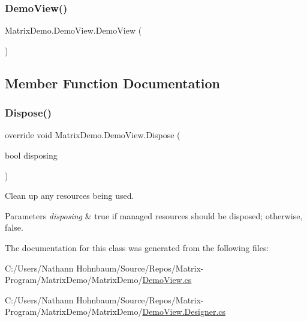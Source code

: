 \subsubsection{\texorpdfstring{Demo\+View()}{DemoView()}}
{\footnotesize\ttfamily Matrix\+Demo.\+Demo\+View.\+Demo\+View (\begin{DoxyParamCaption}{ }\end{DoxyParamCaption})}



\subsection{Member Function Documentation}
\mbox{\label{class_matrix_demo_1_1_demo_view_a81f680e49d2873816234e512c49f07b7}} 
\subsubsection{\texorpdfstring{Dispose()}{Dispose()}}
{\footnotesize\ttfamily override void Matrix\+Demo.\+Demo\+View.\+Dispose (\begin{DoxyParamCaption}\item[{bool}]{disposing }\end{DoxyParamCaption})\hspace{0.3cm}{\ttfamily [protected]}}



Clean up any resources being used. 


\begin{DoxyParams}{Parameters}
{\em disposing} & true if managed resources should be disposed; otherwise, false.\\
\hline
\end{DoxyParams}


The documentation for this class was generated from the following files\+:\begin{DoxyCompactItemize}
\item 
C\+:/\+Users/\+Nathann Hohnbaum/\+Source/\+Repos/\+Matrix-\/\+Program/\+Matrix\+Demo/\+Matrix\+Demo/\mbox{\hyperlink{_demo_view_8cs}{Demo\+View.\+cs}}\item 
C\+:/\+Users/\+Nathann Hohnbaum/\+Source/\+Repos/\+Matrix-\/\+Program/\+Matrix\+Demo/\+Matrix\+Demo/\mbox{\hyperlink{_demo_view_8_designer_8cs}{Demo\+View.\+Designer.\+cs}}\end{DoxyCompactItemize}
